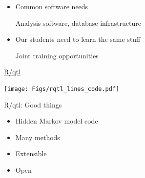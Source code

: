 \documentclass[12pt]{article}
\newcommand{\headsize}{\fontsize{35}{35} \selectfont}
\newcommand{\smallsize}{\fontsize{25}{30} \selectfont}
\newcommand{\smallersize}{\fontsize{20}{25} \selectfont}
\begin{document}
{\begin{minipage}{10in}
\begin{itemize}
   {\smallersize \color{myblue} Pooling data, exploring multiple environments/treatments}

 \item Common software needs

   {\smallersize \color{myblue} Analysis software, database infrastructure}

 \item Our students need to learn the same stuff

   {\smallersize \color{myblue} Joint training opportunities}

 \end{itemize}
 \end{minipage}



\newpage


\headsize \color{myyellow}
\hfill \begin{minipage}{5.75in}
\centering
\href{http://www.rqtl.org}{R/qtl}
\end{minipage}

\vfill

\centerline{\texttt{[image: Figs/rqtl\_lines\_code.pdf]}}

\vspace{15mm}


\newpage


\headsize \color{myyellow}
\hfill \begin{minipage}{5.75in}
\centering
R/qtl: Good things
\end{minipage}

\vspace{25mm}

\color{mywhite}
\smallsize

\hfill \begin{minipage}{10in}
\begin{itemize}
\itemsep24pt
\item Hidden Markov model code

\item Many methods

\item Extensible

\item Open

\end{itemize}
\end{minipage}


}
\end{document}
